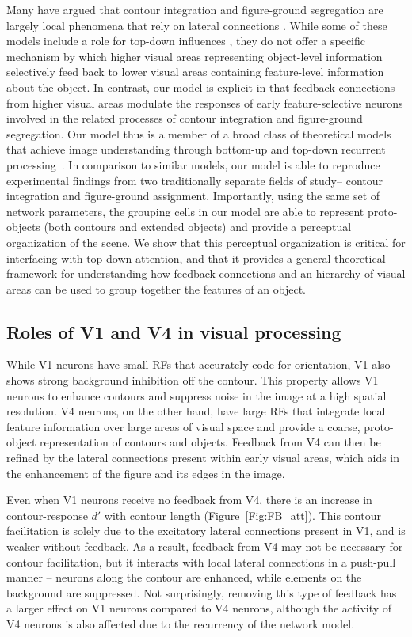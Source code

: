 Many have argued that contour integration and figure-ground segregation are largely local phenomena that rely on lateral connections \citep{Grossberg94, Grossberg97, Li98, Zhaoping05,  Piech_etal13}.  While some of these models include a role for top-down influences \citep{Li98,Piech_etal13}, they do not offer a specific mechanism by which higher visual areas representing object-level information selectively feed back to lower visual areas containing feature-level information about the object.  In contrast, our model is explicit in that feedback connections from higher visual areas modulate the responses of early feature-selective neurons involved in the related processes of contour integration and figure-ground segregation. Our model thus is a member of a broad class of theoretical models that achieve image understanding through bottom-up and top-down recurrent
processing~\citep{Ullman84,Hochstein_Ahissar02,Roelfsema_06,Epshtein_etal08}. In comparison to similar models, our model is able to reproduce
experimental findings from two traditionally separate fields of
study-- contour integration and figure-ground assignment. Importantly,
using the same set of network parameters, the grouping cells in our
model are able to represent proto-objects (both contours and extended
objects) and provide a perceptual organization of the scene. We 
show that this perceptual organization is critical for interfacing with top-down attention, and that it provides a general theoretical framework for understanding how feedback connections and an hierarchy of visual areas can be used to group together the features of an object. 

\subsection{Roles of V1 and V4 in visual processing}

While V1 neurons have small RFs that accurately code for orientation, V1 also shows strong background inhibition off the contour. This property allows V1 neurons to enhance contours and suppress noise in the image at a high spatial resolution. V4 neurons, on the other hand, have large RFs that integrate local feature information over large areas of visual space and provide a coarse, proto-object representation of contours and objects. Feedback from V4 can then be refined by the lateral connections present within early visual areas, which aids in the enhancement of the figure and its edges in the image.

Even when V1 neurons receive no feedback from V4, there is an increase in contour-response $d'$ with contour length (Figure~\ref{Fig:FB_att}). This contour facilitation is solely due to the excitatory lateral connections present in V1, and is weaker without feedback. As a result, feedback from V4 may not be necessary for contour facilitation, but it interacts with local lateral connections in a push-pull manner -- neurons along the contour are enhanced, while elements on the background are suppressed. Not surprisingly, removing this type of feedback has a larger effect on V1 neurons compared to V4 neurons, although the activity of V4 neurons is also affected due to the recurrency of the network model.

